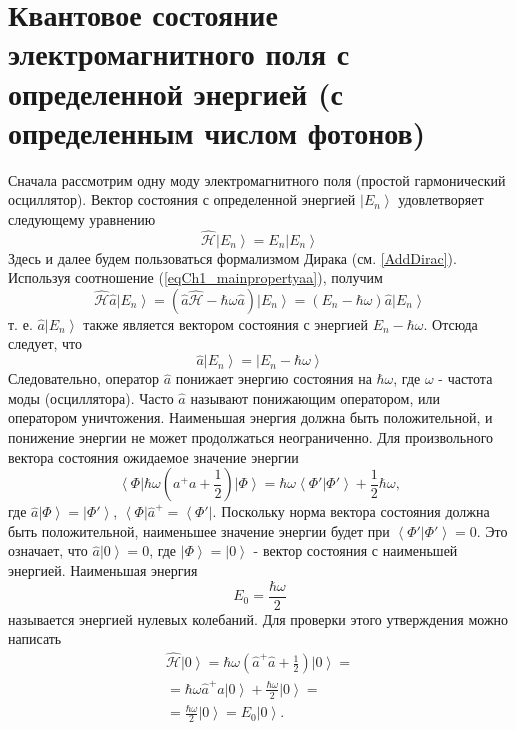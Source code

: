 \section{Квантовое состояние электромагнитного поля с определенной
  энергией (с определенным числом фотонов)}
Сначала рассмотрим одну моду электромагнитного поля (простой
гармонический осциллятор). Вектор состояния с определенной энергией
$\left|E_n\right>$ удовлетворяет следующему уравнению
\begin{equation}
\hat{\mathcal{H}} \left|E_n\right> = E_n \left|E_n\right>
\end{equation}
Здесь и далее будем пользоваться формализмом Дирака (см. 
\autoref{AddDirac}). Используя соотношение (\ref{eqCh1_mainpropertyaa}),
получим 
\begin{equation}
\hat{\mathcal{H}} \hat{a}\left|E_n\right> = 
\left(\hat{a}\hat{\mathcal{H}} -
\hbar\omega\hat{a}\right)\left|E_n\right> =
\left(E_n - \hbar \omega\right)\hat{a}\left|E_n\right>
\end{equation}
т. е. $\hat{a}\left|E_n\right>$ также является вектором состояния с
энергией $E_n - \hbar \omega$.  Отсюда следует, что
\[
\hat{a}\left|E_n\right> = \left|E_n - \hbar \omega \right>
\] 
Следовательно, оператор $\hat{a}$ понижает энергию состояния на $\hbar
\omega$,  где $\omega$ - частота моды (осциллятора). Часто $\hat{a}$
называют понижающим оператором, или оператором уничтожения. Наименьшая
энергия должна быть положительной, и понижение энергии не может
продолжаться неограниченно. Для произвольного вектора состояния
ожидаемое значение энергии 
\begin{equation}
\left< \Phi \right| \hbar \omega \left({a}^{+} {a}  +
\frac{1}{2}\right)\left| \Phi \right> = 
\hbar \omega \left< \Phi' \right. \left| \Phi' \right> + \frac{1}{2}
\hbar \omega,
\end{equation}
где  $\hat{a} \left| \Phi \right> = \left| \Phi' \right>$,  
$\left< \Phi \right| \hat{a}^{+}  = \left< \Phi' \right|$.  Поскольку
норма вектора состояния должна быть положительной, 
наименьшее значение энергии будет при  
\(
\left< \Phi' \right. \left| \Phi' \right> = 0.
\)
Это означает, что $\hat{a}\left|0\right> = 0$,  где
$\left|\Phi\right> = \left|0\right>$ -  вектор состояния с наименьшей
энергией. Наименьшая энергия  
\begin{equation}
E_0 = \frac{\hbar \omega}{2}
\end{equation}
называется энергией нулевых колебаний. Для проверки этого утверждения
можно написать
\begin{eqnarray}
\hat{\mathcal{H}} \left|0\right> = 
\hbar \omega \left(\hat{a}^{+} \hat{a} +
\frac{1}{2}\right) \left|0\right> = 
\nonumber \\
= 
\hbar \omega \hat{a}^{+} \hat{a} \left|0\right> +
\frac{\hbar \omega}{2}\left|0\right> =
\nonumber \\
= \frac{\hbar \omega}{2} \left|0\right> = 
E_0 \left|0\right>.
\label{eqProper0state}
\end{eqnarray}


